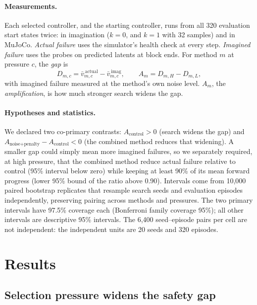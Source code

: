 \documentclass[sigconf,dvipsnames]{acmart}
\begin{document}
\paragraph{Measurements.}
Each selected controller, and the starting controller, runs from all 320
evaluation start states twice: in imagination ($k=0$, and $k=1$ with 32 samples)
and in MuJoCo. \emph{Actual failure} uses the simulator's health check at every
step. \emph{Imagined failure} uses the probes on predicted latents at block ends.
For method $m$ at pressure $c$, the \emph{gap} is
\begin{equation}
 D_{m,c}=\bar{v}^{\,\text{actual}}_{m,c}-\bar{v}^{\,\text{imag}}_{m,c},
 \qquad A_m=D_{m,H}-D_{m,L},
\end{equation}
with imagined failure measured at the method's own noise level. $A_m$, the
\emph{amplification}, is how much stronger search widens the gap.

\paragraph{Hypotheses and statistics.}
We declared two co-primary contrasts: $A_{\text{control}}>0$ (search widens the
gap) and $A_{\text{noise+penalty}}-A_{\text{control}}<0$ (the combined method
reduces that widening). A smaller gap could simply mean more imagined failures,
so we separately required, at high pressure, that the combined method reduce
actual failure relative to control (95\% interval below zero) while keeping at
least 90\% of its mean forward progress (lower 95\% bound of the ratio above
0.90). Intervals come from 10,000 paired bootstrap replicates that resample
search seeds and evaluation episodes independently, preserving pairing across
methods and pressures. The two primary intervals have 97.5\% coverage each
(Bonferroni family coverage 95\%); all other intervals are descriptive 95\%
intervals. The 6,400 seed--episode pairs per cell are not independent: the
independent units are 20 seeds and 320 episodes.

\section{Results}
\label{sec:results}

\subsection{Selection pressure widens the safety gap}
\end{document}

